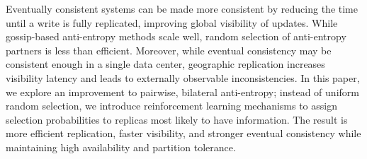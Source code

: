 Eventually consistent systems can be made more consistent by reducing the time
until a write is fully replicated, improving global visibility of updates.
While gossip-based anti-entropy methods scale well, random selection of
anti-entropy partners is less than efficient.
Moreover, while eventual consistency may be consistent enough in a single data
center, geographic replication increases visibility latency and leads to
externally observable inconsistencies.
In this paper, we explore an improvement to pairwise, bilateral anti-entropy;
instead of uniform random selection, we introduce reinforcement learning
mechanisms to assign selection probabilities to replicas most likely to have
information.
The result is more efficient replication, faster visibility, and stronger
eventual consistency while maintaining high availability and partition
tolerance.
